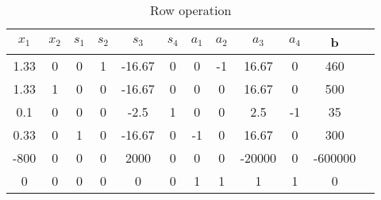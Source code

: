 \documentclass{article}
\begin{document}
  \begin{table}[H]
  \centering
  \caption{Row operation}
  \label{my-label}
  \begin{tabular}{|c|c|c|c|c|c|c|c|c|c|c|c|}
  \hline
  $x_1$ & $x_2$ & $s_1$  & $s_2$ & $s_3$ & $s_4$ & $a_1$ & $a_2$ & $a_3$ & $a_4$ & b   \\ \hline
  1.33   & 0      & 0       & 1   & -16.67    & 0    & 0        & -1    & 16.67  & 0  & 460  \\ \hline
  1.33   & 1      & 0       & 0   & -16.67    & 0    & 0        & 0     & 16.67  & 0  & 500  \\ \hline
  0.1    & 0      & 0       & 0   & -2.5      & 1    & 0        & 0     & 2.5    & -1 & 35   \\ \hline
  0.33   & 0      & 1       & 0   & -16.67    & 0    & -1       & 0     & 16.67  & 0  & 300  \\ \hline
  -800   & 0      & 0       & 0   & 2000      & 0    & 0        & 0     & -20000 & 0 & -600000 \\ \hline
  0      & 0      & 0       & 0   & 0         & 0    & 1        & 1     & 1      & 1 & 0     \\ \hline
  \end{tabular}
  \end{table}
\end{document}
